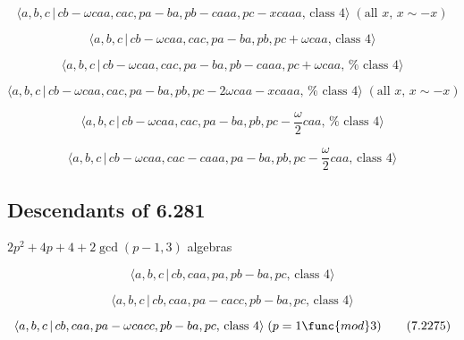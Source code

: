 \documentclass[10pt]{article}
\begin{document}
\begin{equation}
\langle a,b,c\,|\,cb-\omega caa,cac,pa-ba,pb-caaa,pc-xcaaa,\,\text{class }%
4\rangle \;(\text{all }x,\,x\sim -x)  \tag{7.2267}
\end{equation}

\begin{equation}
\langle a,b,c\,|\,cb-\omega caa,cac,pa-ba,pb,pc+\omega caa,\,\text{class }%
4\rangle  \tag{7.2268}
\end{equation}

\begin{equation}
\langle a,b,c\,|\,cb-\omega caa,cac,pa-ba,pb-caaa,pc+\omega caa,\,\text{%
class }4\rangle  \tag{7.2269}
\end{equation}

\begin{equation}
\langle a,b,c\,|\,cb-\omega caa,cac,pa-ba,pb,pc-2\omega caa-xcaaa,\,\text{%
class }4\rangle \;(\text{all }x,\,x\sim -x)  \tag{7.2270}
\end{equation}

\begin{equation}
\langle a,b,c\,|\,cb-\omega caa,cac,pa-ba,pb,pc-\frac{\omega }{2}caa,\,\text{%
class }4\rangle  \tag{7.2271}
\end{equation}

\begin{equation}
\langle a,b,c\,|\,cb-\omega caa,cac-caaa,pa-ba,pb,pc-\frac{\omega }{2}caa,\,%
\text{class }4\rangle  \tag{7.2272}
\end{equation}

\subsection{Descendants of 6.281}

$2p^{2}+4p+4+2\gcd (p-1,3)$ algebras

\begin{equation}
\langle a,b,c\,|\,cb,caa,pa,pb-ba,pc,\,\text{class }4\rangle  \tag{7.2273}
\end{equation}

\begin{equation}
\langle a,b,c\,|\,cb,caa,pa-cacc,pb-ba,pc,\,\text{class }4\rangle 
\tag{7.2274}
\end{equation}

\begin{equation}
\langle a,b,c\,|\,cb,caa,pa-\omega cacc,pb-ba,pc,\,\text{class }4\rangle
\;(p=1\func{mod}3)  \tag{7.2275}
\end{equation}
\end{document}
